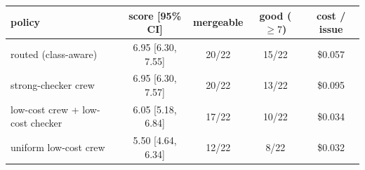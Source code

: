 \begin{tabular}{lcccc}\toprule
policy & score [95\% CI] & mergeable & good ($\geq 7$) & cost / issue\\\midrule
routed (class-aware) & 6.95 [6.30, 7.55] & 20/22 & 15/22 & \$0.057 \\
strong-checker crew & 6.95 [6.30, 7.57] & 20/22 & 13/22 & \$0.095 \\
low-cost crew + low-cost checker & 6.05 [5.18, 6.84] & 17/22 & 10/22 & \$0.034 \\
uniform low-cost crew & 5.50 [4.64, 6.34] & 12/22 & 8/22 & \$0.032 \\
\bottomrule\end{tabular}
